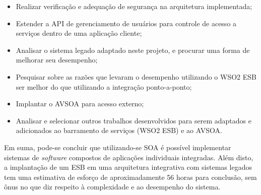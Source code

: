 \begin{itemize}
\item Realizar verificação e adequação de segurança na arquitetura implementada;
\item Estender a API de gerenciamento de usuários para controle de acesso a serviços dentro de uma aplicação cliente;
\item Analisar o sistema legado adaptado neste projeto, e procurar uma forma de melhorar seu desempenho;
\item Pesquisar sobre as razões que levaram o desempenho utilizando o WSO2 ESB ser melhor do que utilizando a integração ponto-a-ponto;
\item Implantar o AVSOA para acesso externo;
\item Analisar e selecionar outros trabalhos desenvolvidos para serem adaptados e adicionados ao barramento de serviços (WSO2 ESB) e ao AVSOA.
\end{itemize}


Em suma, pode-se concluir que utilizando-se SOA é possível implementar sistemas de \textit{software} compostos de aplicações individuais integradas. Além disto, a implantação de um ESB em uma arquitetura integrativa com sistemas legados tem uma estimativa de esforço de aproximadamente 56 horas para conclusão, sem ônus no que diz respeito à complexidade e ao desempenho do sistema.

